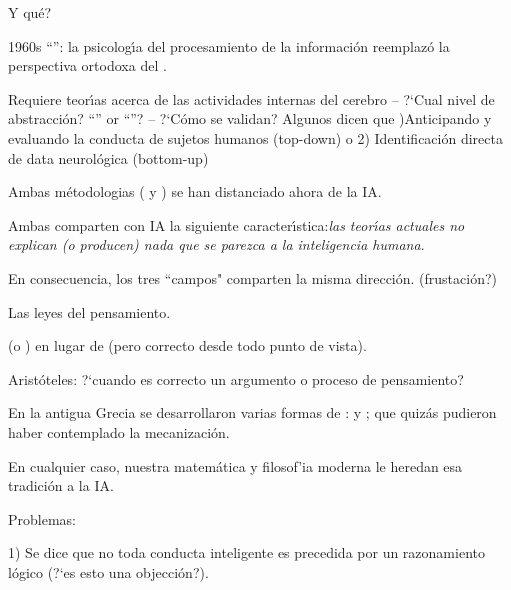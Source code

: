 \documentclass[10pt]{article}
\begin{document}
\begin{huge}
Y qu{\'e}?


1960s ``'': la psicolog{\'\i}a
del procesamiento de la informaci{\'o}n reemplaz{\'o} la
perspectiva ortodoxa del .

Requiere teor{\'\i}as acerca de las actividades internas del
cerebro\al
 -- ?`Cual nivel de abstracci{\'o}n? ``'' or ``''?\al
 -- ?`C{\'o}mo se validan? Algunos dicen que )Anticipando y evaluando la conducta de sujetos humanos (top-down)
    o 2) Identificaci{\'o}n directa de data neurol{\'o}gica (bottom-up)



Ambas m{\'e}todologias (  y ) se han distanciado ahora de la IA.

Ambas comparten con IA la siguiente caracter{\'\i}stica:{\em las
teor{\'\i}as actuales no explican (o producen) nada que se parezca
a la inteligencia humana}.

En consecuencia, los tres ``campos" comparten la misma
direcci{\'o}n. (frustaci{\'o}n?)


Las leyes del pensamiento.

 (o ) en lugar de 
(pero correcto desde todo punto de vista).

Arist{\'o}teles: ?`cuando es correcto un argumento o proceso de
pensamiento?

En la antigua Grecia se desarrollaron varias formas de
:  y ;
que quiz{\'a}s pudieron haber contemplado la mecanizaci{\'o}n.


En cualquier caso, nuestra matem{\'a}tica y filosof'ia moderna le
heredan esa tradici{\'o}n a la IA.

Problemas:

1) Se dice que no toda conducta inteligente es precedida por un
razonamiento l{\'o}gico (?`es esto una objecci{\'o}n?).


\end{huge}
\end{document}
